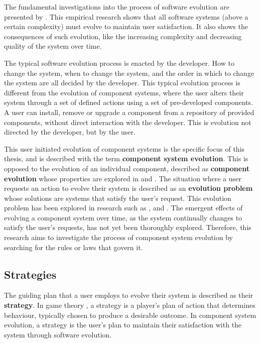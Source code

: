 The fundamental investigations into the process of software evolution are presented by \citep{lehman1980}.
This empirical research shows that all software systems (above a certain complexity) must evolve to maintain user satisfaction.
It also shows the consequences of such evolution, like the increasing complexity and decreasing quality of the system over time.

The typical software evolution process is enacted by the developer.
How to change the system, when to change the system, and the order in which to change the system are all decided by the developer.
This typical evolution process is different from the evolution of component systems, 
where the user alters their system through a set of defined actions using a set of pre-developed components.
A user can install, remove or upgrade a component from a repository of provided components, without direct interaction with the developer.
This is evolution not directed by the developer, but by the user. 

This user initiated evolution of component systems is the specific focus of this thesis, and is described with the term \textbf{component system evolution}.
This is opposed to the evolution of an individual component, described as \textbf{component evolution} whose properties are explored in \citep{vasa2007patterns} and \citep{Stuckenholz2005}.
The situation where a user requests an action to evolve their system is described as an \textbf{evolution problem} whose solutions are systems that satisfy the user's request.
This evolution problem has been explored in research such as \citep{Ryan2005}, \citep{argelich2010solving} and \citep{di2010supporting}.
The emergent effects of evolving a component system over time, as the system continually changes to satisfy the user's requests, has not yet been thoroughly explored.
Therefore, this research aims to investigate the process of component system evolution by searching for the rules or laws that govern it.

\subsection{Strategies}
The guiding plan that a user employs to evolve their system is described as their \textbf{strategy}.
In game theory \citep{rubinstein1991comments}, a strategy is a player's plan of action that determines behaviour, typically chosen to produce a desirable outcome.
In component system evolution, a strategy is the user's plan to maintain their satisfaction with the system through software evolution.

